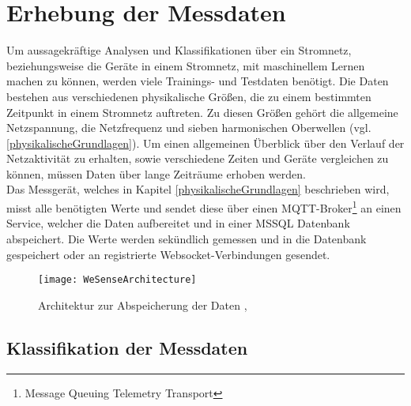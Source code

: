 
\section{Erhebung der Messdaten} \label{Messdaten}

    Um aussagekräftige Analysen und Klassifikationen über ein Stromnetz, beziehungsweise die Geräte in einem Stromnetz, mit maschinellem Lernen machen zu können, werden viele Trainings- und Testdaten benötigt.
    Die Daten bestehen aus verschiedenen physikalische Größen, die zu einem bestimmten Zeitpunkt in einem Stromnetz auftreten.
    Zu diesen Größen gehört die allgemeine Netzspannung, die Netzfrequenz und sieben harmonischen Oberwellen (vgl. \ref{physikalischeGrundlagen}).
    Um einen allgemeinen Überblick über den Verlauf der Netzaktivität zu erhalten, sowie verschiedene Zeiten und Geräte vergleichen zu können, müssen Daten über lange Zeiträume erhoben werden.\\
    \newline
    Das Messgerät, welches in Kapitel \ref{physikalischeGrundlagen} beschrieben wird, misst alle benötigten Werte und sendet diese über einen MQTT-Broker\footnote{Message Queuing Telemetry Transport} an einen Service, welcher die Daten aufbereitet und in einer MSSQL Datenbank abspeichert.
    Die Werte werden sekündlich gemessen und in die Datenbank gespeichert oder an registrierte Websocket-Verbindungen gesendet.
    \newline

    \begin{figure}[h]
        \centering
        \texttt{[image: WeSenseArchitecture]}
        \caption{Architektur zur Abspeicherung der Daten \protect\cite{DrawIO}, \protect\cite{Tensorflow}}
        \label{fig:ArchitectureWesense}
    \end{figure}

    \subsection*{Klassifikation der Messdaten}\label{KlassifikationDerMessdaten}

